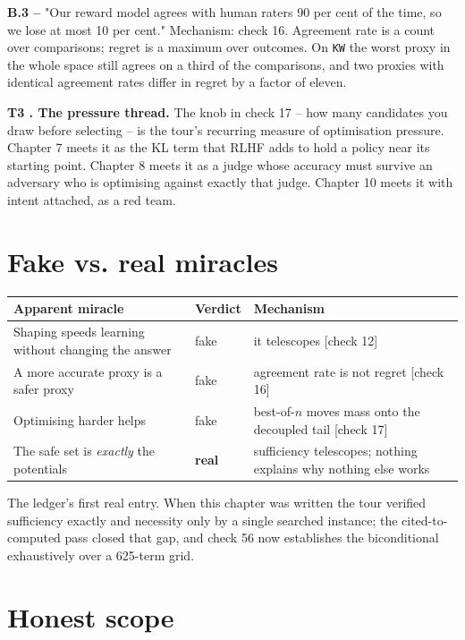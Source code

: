 \textbf{B.3 --} "Our reward model agrees with human raters 90 per cent of the time, so we lose at most 10 per cent." Mechanism: check 16. Agreement rate is a count over comparisons; regret is a maximum over outcomes. On \texttt{KW} the worst proxy in the whole space still agrees on a third of the comparisons, and two proxies with identical agreement rates differ in regret by a factor of eleven.

\textbf{T3 . The pressure thread.} The knob in check 17 -- how many candidates you draw before selecting -- is the tour's recurring measure of optimisation pressure. Chapter 7 meets it as the KL term that RLHF adds to hold a policy near its starting point. Chapter 8 meets it as a judge whose accuracy must survive an adversary who is optimising against exactly that judge. Chapter 10 meets it with intent attached, as a red team.

\section*{Fake vs. real miracles}

\noindent

\noindent
\begin{tabularx}{\textwidth}{XXX}
\toprule
Apparent miracle & Verdict & Mechanism \\
\midrule
Shaping speeds learning without changing the answer & fake & it telescopes [check 12] \\
A more accurate proxy is a safer proxy & fake & agreement rate is not regret [check 16] \\
Optimising harder helps & fake & best-of-$n$ moves mass onto the decoupled tail [check 17] \\
The safe set is \emph{exactly} the potentials & \textbf{real} & sufficiency telescopes; nothing explains why nothing else works \\
\bottomrule
\end{tabularx}
\par\medskip

The ledger's first real entry. When this chapter was written the tour verified sufficiency exactly and necessity only by a single searched instance; the cited-to-computed pass closed that gap, and check 56 now establishes the biconditional exhaustively over a 625-term grid.

\section*{Honest scope}

